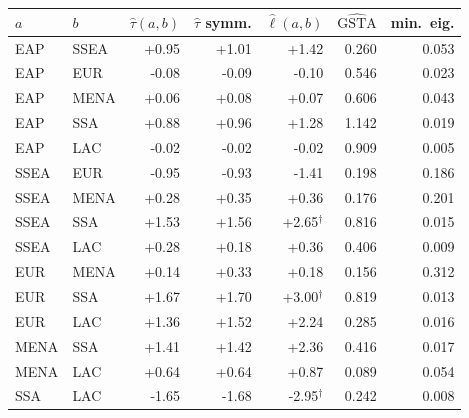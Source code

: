\begin{tabular}{llrrrrr}
\toprule
$a$ & $b$ & $\hat\tau(a,b)$ & $\hat\tau$ symm. & $\hat\ell(a,b)$ & $\widehat{\mathrm{GSTA}}$ & min.\ eig.\\
\midrule
EAP & SSEA & +0.95 & +1.01 & +1.42 & 0.260 & 0.053\\
EAP & EUR & -0.08 & -0.09 & -0.10 & 0.546 & 0.023\\
EAP & MENA & +0.06 & +0.08 & +0.07 & 0.606 & 0.043\\
EAP & SSA & +0.88 & +0.96 & +1.28 & 1.142 & 0.019\\
EAP & LAC & -0.02 & -0.02 & -0.02 & 0.909 & 0.005\\
SSEA & EUR & -0.95 & -0.93 & -1.41 & 0.198 & 0.186\\
SSEA & MENA & +0.28 & +0.35 & +0.36 & 0.176 & 0.201\\
SSEA & SSA & +1.53 & +1.56 & +2.65$^\dagger$ & 0.816 & 0.015\\
SSEA & LAC & +0.28 & +0.18 & +0.36 & 0.406 & 0.009\\
EUR & MENA & +0.14 & +0.33 & +0.18 & 0.156 & 0.312\\
EUR & SSA & +1.67 & +1.70 & +3.00$^\dagger$ & 0.819 & 0.013\\
EUR & LAC & +1.36 & +1.52 & +2.24 & 0.285 & 0.016\\
MENA & SSA & +1.41 & +1.42 & +2.36 & 0.416 & 0.017\\
MENA & LAC & +0.64 & +0.64 & +0.87 & 0.089 & 0.054\\
SSA & LAC & -1.65 & -1.68 & -2.95$^\dagger$ & 0.242 & 0.008\\
\bottomrule
\end{tabular}
